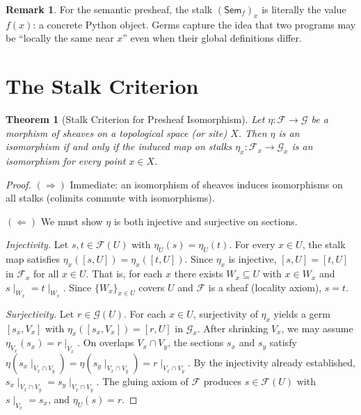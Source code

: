 \documentclass[11pt,a4paper]{report}
\theoremstyle{definition}
\newtheorem{remark}[definition]{Remark}
\theoremstyle{plain}
\newtheorem{theorem}[definition]{Theorem}
\newcommand{\Sem}{\mathsf{Sem}}
\newcommand{\presheaf}{\mathcal{F}}
\newcommand{\restr}[2]{#1\!\!\mid_{#2}}
\begin{document}
\begin{remark}
For the semantic presheaf, the stalk $(\Sem_f)_x$ is literally the
value $f(x)$: a concrete Python object.  Germs capture the idea that
two programs may be ``locally the same near $x$'' even when their
global definitions differ.
\end{remark}

\section{The Stalk Criterion}

\begin{theorem}[Stalk Criterion for Presheaf Isomorphism]
\label{thm:stalk-criterion}
Let $\eta : \presheaf \to \mathcal{G}$ be a morphism of sheaves on
a topological space (or site) $X$.  Then $\eta$ is an isomorphism
if and only if the induced map on stalks
$\eta_x : \presheaf_x \to \mathcal{G}_x$
is an isomorphism for every point $x \in X$.
\end{theorem}

\begin{proof}
$(\Rightarrow)$ Immediate: an isomorphism of sheaves induces isomorphisms
on all stalks (colimits commute with isomorphisms).

$(\Leftarrow)$ We must show $\eta$ is both injective and surjective
on sections.

\emph{Injectivity.}
Let $s, t \in \presheaf(U)$ with $\eta_U(s) = \eta_U(t)$.  For
every $x \in U$, the stalk map satisfies
$\eta_x([s, U]) = \eta_x([t, U])$.  Since $\eta_x$ is injective,
$[s, U] = [t, U]$ in $\presheaf_x$ for all $x \in U$.
That is, for each $x$ there exists $W_x \subseteq U$ with $x \in W_x$
and $\restr{s}{W_x} = \restr{t}{W_x}$.  Since $\{W_x\}_{x \in U}$
covers $U$ and $\presheaf$ is a sheaf (locality axiom), $s = t$.

\emph{Surjectivity.}
Let $r \in \mathcal{G}(U)$.  For each $x \in U$, surjectivity of
$\eta_x$ yields a germ $[s_x, V_x]$ with $\eta_x([s_x, V_x]) =
[r, U]$ in $\mathcal{G}_x$.  After shrinking $V_x$, we may
assume $\eta_{V_x}(s_x) = \restr{r}{V_x}$.  On overlaps $V_x
\cap V_y$, the sections $s_x$ and $s_y$ satisfy
$\eta(\restr{s_x}{V_x \cap V_y}) = \eta(\restr{s_y}{V_x \cap V_y})
= \restr{r}{V_x \cap V_y}$.  By the injectivity already established,
$\restr{s_x}{V_x \cap V_y} = \restr{s_y}{V_x \cap V_y}$.  The
gluing axiom of $\presheaf$ produces $s \in \presheaf(U)$ with
$\restr{s}{V_x} = s_x$, and $\eta_U(s) = r$.
\end{proof}
\end{document}
